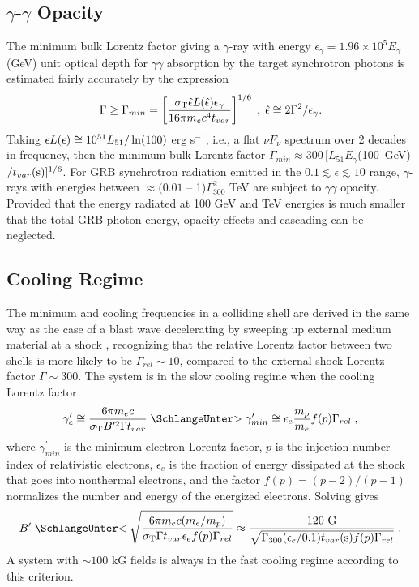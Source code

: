 \subsection{$\gamma$-$\gamma$ Opacity}
The minimum bulk Lorentz factor giving a $\gamma$-ray with energy
$\epsilon_\gamma = 1.96\times 10^{5} E_\gamma$(GeV) unit optical depth
for $\gamma\gamma$ absorption by the target synchrotron photons is
estimated fairly accurately by the expression
\begin{equation}
\Gamma \geq \Gamma_{min} = \left[ { \sigma_{\rm T} \hat\epsilon L(\hat \epsilon ) \epsilon_{\gamma}
\over 16 \pi m_ec^4 t_{var} }\right ]^{1/6}\;,\; \hat \epsilon \cong 2\Gamma^2/\epsilon_\gamma .
\label{tauep}
\end{equation}
Taking $\epsilon L(\epsilon) \cong 10^{51}L_{51}/\ln (100)$ erg s$^{-1}$, i.e., a
flat $\nu F_\nu$ spectrum over 2 decades in frequency, then the
minimum bulk Lorentz factor $\Gamma_{min} \approx 300 \,[L_{51}
E_\gamma$(100~GeV)$/t_{var}({\rm s})]^{1/6}$.  For GRB synchrotron
radiation emitted in the $0.1 \lesssim \epsilon \lesssim 10$ range,
$\gamma$-rays with energies between $\approx (0.01$ --
1)$\Gamma_{300}^2$ TeV are subject to $\gamma\gamma$ opacity.
Provided that the energy radiated at 100 GeV and TeV energies is much
smaller that the total GRB photon energy, opacity effects and
cascading can be neglected.





\subsection{Cooling Regime}

The minimum and cooling frequencies in a colliding shell are derived
in the same way as the case of a blast wave decelerating by sweeping
up external medium material at a shock \cite{sari:1998}, recognizing
that the relative Lorentz factor between two shells is more likely to
be $\Gamma_{rel}\sim 10$, compared to the external shock Lorentz
factor $\Gamma \sim 300$. The system is in the slow cooling regime
when the cooling Lorentz factor
\begin{equation}
\gamma_c^\prime \cong {6\pi m_e c\over \sigma_{\rm T} B^{\prime 2}\Gamma t_{var} }
\gtrsim
\gamma^\prime_{min} \cong \epsilon_e {m_p\over m_e} f(p) \Gamma_{rel}\;,
\label{gammaprimemin}
\end{equation}
where $\gamma^\prime_{min}$ is the minimum electron Lorentz factor,
$p$ is the injection number index of relativistic electrons,
$\epsilon_e$ is the fraction of energy dissipated at the shock that
goes into nonthermal electrons, and the factor $f(p) = (p-2)/(p-1)$
normalizes the number and energy of the energized electrons.  Solving
gives
\begin{equation}
B^{\prime}
\lesssim 
\sqrt{ 6\pi m_e c (m_e/m_p)\over \sigma_{\rm T} \Gamma t_{var}\epsilon_e f(p)\Gamma_{rel} }
\approx {120 {\rm ~G}\over \sqrt{\Gamma_{300} (\epsilon_e/0.1) t_{var}({\rm s}) f(p)\Gamma_{rel}}}\;.
\label{gammaprimemin}
\end{equation}
A system with $\sim 100$ kG fields is always in the fast cooling
regime according to this criterion.


